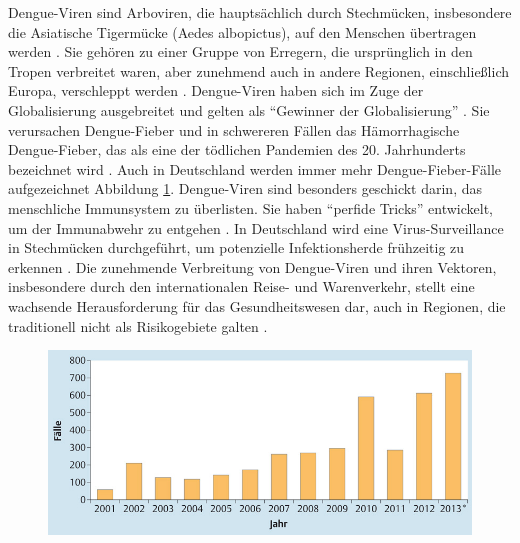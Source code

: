 \documentclass[german,version-2022-01]{uzl-thesis}
\begin{document}
Dengue-Viren sind Arboviren, die haupts\"achlich durch Stechm\"ucken, insbesondere die Asiatische Tigerm\"ucke (Aedes albopictus), auf den Menschen \"ubertragen werden \cite{cramer_dengue-virus_2014}. Sie geh\"oren zu einer Gruppe von Erregern, die urspr\"unglich in den Tropen verbreitet waren, aber zunehmend auch in andere Regionen, einschlie\ss{}lich Europa, verschleppt werden \cite{cramer_dengue-virus_2014}. Dengue-Viren haben sich im Zuge der Globalisierung ausgebreitet und gelten als ``Gewinner der Globalisierung'' \cite{meyding-lamade_winners_2018}.
Sie verursachen Dengue-Fieber und in schwereren F\"allen das H\"amorrhagische Dengue-Fieber, das als eine der t\"odlichen Pandemien des 20. Jahrhunderts bezeichnet wird \cite{kuhnle_dengue-fieber_1999}. Auch in Deutschland werden immer mehr Dengue-Fieber-F\"alle aufgezeichnet Abbildung \ref{fig:Dengue_virus_infektionszahlen_deutschland}. Dengue-Viren sind besonders geschickt darin, das menschliche Immunsystem zu \"uberlisten. Sie haben "`perfide Tricks"' entwickelt, um der Immunabwehr zu entgehen \cite{janisch_klein_2017}. In Deutschland wird eine Virus-Surveillance in Stechm\"ucken durchgef\"uhrt, um potenzielle Infektionsherde fr\"uhzeitig zu erkennen \cite{cramer_dengue-virus_2014}. Die zunehmende Verbreitung von Dengue-Viren und ihren Vektoren, insbesondere durch den internationalen Reise- und Warenverkehr, stellt eine wachsende Herausforderung f\"ur das Gesundheitswesen dar, auch in Regionen, die traditionell nicht als Risikogebiete galten \cite{cramer_dengue-virus_2014}. 

\begin{figure}[htpb]
  \centering
  \includegraphics[scale=0.5]{Images/infektionszahlen_dengue_virus_deutschland.jpeg}
  \caption{ \cite{cramer_dengue-virus_2014}}
  \label{fig:Dengue_virus_infektionszahlen_deutschland}
\end{figure}
\end{document}
